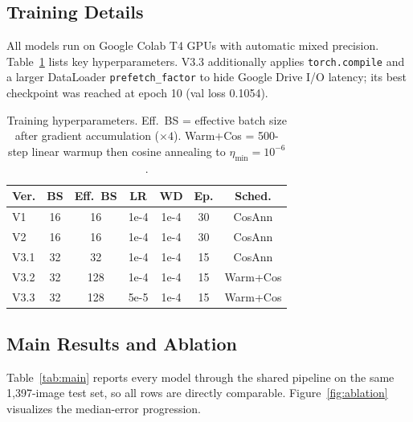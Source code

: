 \documentclass[10pt,twocolumn,letterpaper]{article}
\begin{document}
\subsection{Training Details}

All models run on Google Colab T4 GPUs with automatic mixed precision.
Table~\ref{tab:hparams} lists key hyperparameters.
V3.3 additionally applies \texttt{torch.compile} and a larger DataLoader
\texttt{prefetch\_factor} to hide Google Drive I/O latency; its best checkpoint
was reached at epoch 10 (val loss 0.1054).

\begin{table}[t]
\centering\small
\begin{tabular}{@{}lcccccc@{}}
\toprule
Ver. & BS & Eff.\ BS & LR & WD & Ep. & Sched. \\
\midrule
V1   & 16 & 16  & 1e-4 & 1e-4 & 30 & CosAnn \\
V2   & 16 & 16  & 1e-4 & 1e-4 & 30 & CosAnn \\
V3.1 & 32 & 32  & 1e-4 & 1e-4 & 15 & CosAnn \\
V3.2 & 32 & 128 & 1e-4 & 1e-4 & 15 & Warm+Cos \\
V3.3 & 32 & 128 & 5e-5 & 1e-4 & 15 & Warm+Cos \\
\bottomrule
\end{tabular}
\smallskip
\caption{Training hyperparameters. Eff.\ BS = effective batch size after
gradient accumulation ($\times4$). Warm+Cos = 500-step linear warmup then
cosine annealing to $\eta_{\min}=10^{-6}$.}
\label{tab:hparams}
\end{table}

\subsection{Main Results and Ablation}
\label{sec:main}

Table~\ref{tab:main} reports every model through the shared pipeline on the same
1{,}397-image test set, so all rows are directly comparable.
Figure~\ref{fig:ablation} visualizes the median-error progression.
\end{document}

